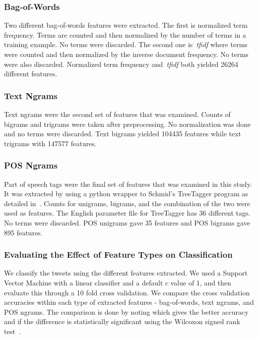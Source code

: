 \documentclass[a4paper]{llncs}
\begin{document}
%
%

\subsubsection{Bag-of-Words}

Two different bag-of-words features were extracted. The first is normalized term frequency. Terms are counted and then normalized by the number of terms in a training example. No terms were discarded. The second one is~\textit{tfidf} where terms were counted and then normalized by the inverse document frequency. No terms were also discarded. Normalized term frequency and~\textit{tfidf} both yielded 26264 different features.

\subsubsection{Text Ngrams}
Text ngrams were the second set of features that was examined. Counts of bigrams and trigrams were taken after preprocessing. No normalization was done and no terms were discarded. Text bigrams yielded 104435 features while text trigrams with 147577 features. 

\subsubsection{POS Ngrams}
Part of speech tags were the final set of features that was examined in this study. It was extracted by using a python wrapper to Schmid's TreeTagger program as detailed in~\cite{schmid1994probabilistic}. Counts for unigrams, bigrams, and the combination of the two were used as features. The English parameter file for TreeTagger has 36 different tags. No terms were discarded. POS unigrams gave 35 features and POS bigrams gave 895 features.

\subsubsection{Evaluating the Effect of Feature Types on Classification}
We classify the tweets using the different features extracted. We used a Support Vector Machine with a linear classifier and a default $c$ value of 1, and then evaluate this through a 10 fold cross validation. We compare the cross validation accuracies within each type of extracted features - bag-of-words, text ngrams, and POS ngrams. The comparison is done by noting which gives the better accuracy and if the difference is statistically significant using the Wilcoxon signed rank test~\cite{wilcoxon1945individual}.
\end{document}
